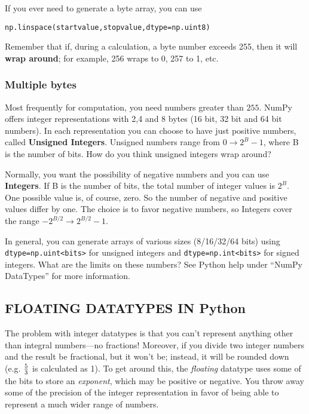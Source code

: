 \documentclass[psfig,preprint]{aastex}
\begin{document}
If you ever need to generate a byte array, you can use

{\tt np.linspace(startvalue,stopvalue,dtype=np.uint8)}

Remember that if, during a calculation, a byte number exceeds 255, then it will {\bf wrap around}; for example, 256 wraps to 0, 257 to 1, etc.

\subsubsection{Multiple bytes}

        Most frequently for computation, you need numbers greater than $255$. NumPy 
offers integer representations with 2,4 and 8 bytes (16 bit, 32 bit and 64 bit numbers).
In each representation you can choose to have just positive numbers, called 
{\bf Unsigned Integers}. Unsigned numbers range from $0 \rightarrow 2^{B} -1$, where B 
is the number of bits. How do you think unsigned integers wrap around?

	Normally, you want the possibility of negative numbers and you can use 
{\bf Integers}. If B is the number of bits, the total number of integer values is $2^{B}$. 
One possible value is, of course, zero.  So the number of negative and positive values 
differ by one.  The choice is to favor negative numbers, so Integers cover the range 
$-2^{B/2} \rightarrow 2^{B/2}-1$. 

	In general, you can generate arrays of various sizes (8/16/32/64 bits) using 
{\tt dtype=np.uint<bits>} for unsigned integers and {\tt dtype=np.int<bits>} for 
signed integers. What are the limits on these numbers? See Python help 
under ``NumPy DataTypes'' for more information.  

\subsection {FLOATING DATATYPES IN Python} \label{floats}

	The problem with integer datatypes is that you can't represent
anything other than integral numbers---no fractions! Moreover, if you
divide two integer numbers and the result be fractional, but it
won't be; instead, it will be rounded down (e.g.  $5 \over 3$ is
calculated as 1).  To get around this, the {\it floating} datatype uses
some of the bits to store an {\it exponent}, which may be positive or
negative.  You throw away some of the precision of the integer
representation in favor of being able to represent a much wider range of
numbers. 
\end{document}
